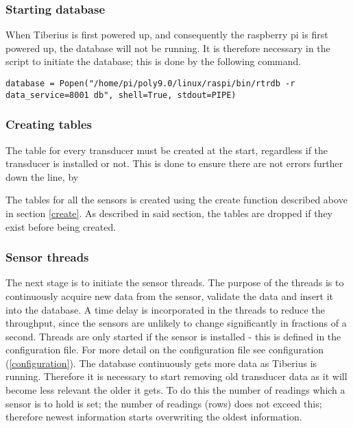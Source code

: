 \subsubsection{Starting database}
When Tiberius is first powered up, and consequently the raspberry pi is first powered  up, the database will not be running. 
It is therefore necessary in the script to initiate the database; this is done by the following command.

\begin{lstlisting}[style=custompython]
database = Popen("/home/pi/poly9.0/linux/raspi/bin/rtrdb -r data_service=8001 db", shell=True, stdout=PIPE)
\end{lstlisting}

\subsubsection{Creating tables}
The table for every transducer must be created at the start, regardless if the transducer is installed or not. This is done to ensure there are not errors further down the line, by 

The tables for all the sensors is created using the create function described above in section \ref{create}. As described in said section, the tables are dropped if they exist before being created.
\subsubsection{Sensor threads}
The next stage is to initiate the sensor threads. The purpose of the threads is to continuously acquire new data from the sensor, validate the data and insert it into the database. A time delay is incorporated in the threads to reduce the throughput, since the sensors are unlikely to change significantly in fractions of a second.
\newline
Threads are only started if the sensor is installed - this is defined in the configuration file. For more detail on the configuration file see configuration (\ref{configuration}).
\newline
The database continuously gets more data as Tiberius is running. Therefore it is necessary to start removing old transducer data as it will become less relevant the older it gets. To do this the number of readings which a sensor is to hold is set; the number of readings (rows) does not exceed this; therefore newest information starts overwriting the oldest information. 

